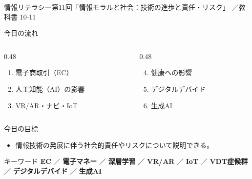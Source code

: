 \documentclass[aspectratio=43,professionalfonts,handout,10pt]{beamer}
\newcommand{\LectureNum}{11}
\newcommand{\LectureTitle}{情報モラルと社会：技術の進歩と責任・リスク}
\newcommand{\CourseName}{情報リテラシー}
\newcommand{\TextPages}{10-11}
\begin{document}

\begin{frame}{\CourseName\quad 第\LectureNum 回「\LectureTitle 」}
  {\small \TermName\quad \TeacherName\quad ／\quad 教科書 \TextPages}

  \vfill

  \begin{block}{今日の流れ}
    \small
    \begin{columns}[T]
      \begin{column}{0.48\textwidth}
        \begin{enumerate}
          \item 電子商取引（EC）
          \item 人工知能（AI）の影響
          \item VR/AR・ナビ・IoT
        \end{enumerate}
      \end{column}
      \begin{column}{0.48\textwidth}
        \begin{enumerate}\setcounter{enumi}{3}
          \item 健康への影響
          \item デジタルデバイド
          \item 生成AI
        \end{enumerate}
      \end{column}
    \end{columns}
  \end{block}
  \vfill

  \begin{block}{今日の目標}
    \begin{itemize}
      \item 情報技術の発展に伴う社会的責任やリスクについて説明できる。
    \end{itemize}
  \end{block}
  \vfill

  \begin{exampleblock}{キーワード}
    \small \textbf{EC} ／ \textbf{電子マネー} ／ \textbf{深層学習} ／ \textbf{VR/AR} ／ \textbf{IoT} ／ \textbf{VDT症候群} ／ \textbf{デジタルデバイド} ／ \textbf{生成AI}
  \end{exampleblock}
\end{frame}

\end{document}
